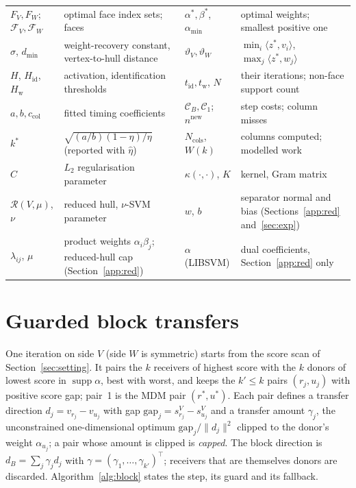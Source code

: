 \documentclass[pdflatex,sn-apa]{sn-jnl}%
\theoremstyle{thmstyleone}
\theoremstyle{thmstyletwo}
\newcommand{\ip}[2]{\langle #1, #2 \rangle}
\newcommand{\norm}[1]{\lVert #1 \rVert}
\begin{document}
\begin{table}[t]
\begin{tabular}{@{}l>{\raggedright\arraybackslash}p{3.6cm}l>{\raggedright\arraybackslash}p{4.0cm}@{}}
$F_V,F_W$; $\mathcal F_V,\mathcal F_W$ & optimal face index sets; faces & $\alpha^*,\beta^*$, $\alpha_{\min}$ & optimal weights; smallest positive one \\
$\sigma$, $d_{\min}$ & weight-recovery constant, vertex-to-hull distance & $\vartheta_V,\vartheta_W$ & $\min_i\ip{z^*}{v_i}$, $\max_j\ip{z^*}{w_j}$ \\
$H$, $H_{\mathrm{id}}$, $H_{\mathrm w}$ & activation, identification thresholds & $t_{\mathrm{id}},t_{\mathrm w}$, $N$ & their iterations; non-face support count \\
$a,b,c_{\mathrm{col}}$ & fitted timing coefficients & $\mathcal C_B,\mathcal C_1$; $n^{\mathrm{new}}$ & step costs; column misses \\
$k^*$ & $\sqrt{(a/b)(1-\eta)/\eta}$ (reported with $\hat\eta$) & $N_{\mathrm{cols}}$, $W(k)$ & columns computed; modelled work \\
$C$ & $L_2$ regularisation parameter & $\kappa(\cdot,\cdot)$, $K$ & kernel, Gram matrix \\
$\mathcal R(V,\mu)$, $\nu$ & reduced hull, $\nu$-SVM parameter & $w$, $b$ & separator normal and bias (Sections~\ref{app:red} and~\ref{sec:exp}) \\
$\lambda_{ij}$, $\mu$ & product weights $\alpha_i\beta_j$; reduced-hull cap (Section~\ref{app:red}) & $\alpha$ (LIBSVM) & dual coefficients, Section~\ref{app:red} only \\
\bottomrule\end{tabular}\end{table}

\section{Guarded block transfers}\label{sec:alg}

One iteration on side $V$ (side $W$ is symmetric) starts from the
score scan of Section~\ref{sec:setting}. It pairs the $k$ receivers of
highest score with the $k$ donors of lowest score in
$\operatorname{supp}\alpha$, best with worst, and keeps the $k'\le k$
pairs $(r_j,u_j)$ with positive score gap; pair~1 is the MDM pair
$(r^*,u^*)$. Each pair defines a transfer direction $d_j=v_{r_j}-v_{u_j}$
with gap $\mathrm{gap}_j=s^V_{r_j}-s^V_{u_j}$ and a transfer amount
$\gamma_j$, the unconstrained one-dimensional optimum
$\mathrm{gap}_j/\norm{d_j}^2$ clipped to the donor's weight
$\alpha_{u_j}$; a pair whose amount is clipped is \emph{capped}. The
block direction is $d_B=\sum_j\gamma_jd_j$ with
$\gamma=(\gamma_1,\dots,\gamma_{k'})^\top$; receivers that are
themselves donors are discarded. Algorithm~\ref{alg:block} states the
step, its guard and its fallback.
\end{document}
